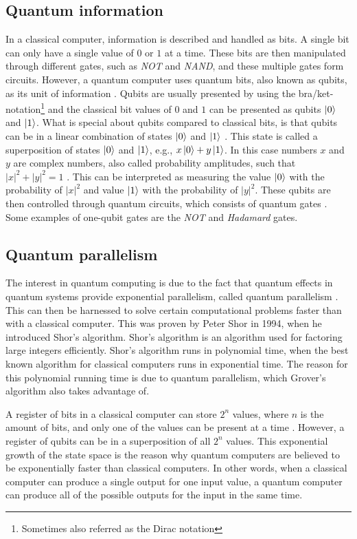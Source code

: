 \documentclass[english,oneside,openright]{UH_DS_report}
\begin{document}
\subsection{Quantum information}
In a classical computer, information is described and handled as bits. A single bit can only have a single value of $0$ or $1$ at a time. These bits are then manipulated through different gates, such as \emph{NOT} and \emph{NAND}, and these multiple gates form circuits. However, a quantum computer uses quantum bits, also known as qubits, as its unit of information \cite{introtoqc}. Qubits are usually presented by using the bra/ket-notation\footnote{Sometimes also referred as the Dirac notation} and the classical bit values of $0$ and $1$ can be presented as qubits $\ket{0}$ and $\ket{1}$. What is special about qubits compared to classical bits, is that qubits can be in a linear combination of states $\ket{0}$ and $\ket{1}$ \cite{lavor2003grover}. This state is called a superposition of states $\ket{0}$ and $\ket{1}$, e.g., $x \ket{0} + y \ket{1}$. In this case numbers $x$ and $y$ are complex numbers, also called probability amplitudes, such that $|x|^{2} + |y|^{2} = 1$ \cite{qcdb}. This can be interpreted as measuring the value $\ket{0}$ with the probability of $|x|^{2}$ and value $\ket{1}$ with the probability of $|y|^{2}$. These qubits are then controlled through quantum circuits, which consists of quantum gates \cite{lavor2003grover}. Some examples of one-qubit gates are the \emph{NOT} and \emph{Hadamard} gates.

\subsection{Quantum parallelism}
The interest in quantum computing is due to the fact that quantum effects in quantum systems provide exponential parallelism, called quantum parallelism \cite{introtoqc}. This can then be harnessed to solve certain computational problems faster than with a classical computer. This was proven by Peter Shor in 1994, when he introduced Shor's algorithm. Shor's algorithm is an algorithm used for factoring large integers efficiently. Shor's algorithm runs in polynomial time, when the best known algorithm for classical computers runs in exponential time. The reason for this polynomial running time is due to quantum parallelism, which Grover's algorithm also takes advantage of.

 A register of bits in a classical computer can store $2^{n}$ values, where $n$ is the amount of bits, and only one of the values can be present at a time \cite{introtoqc}. However, a register of qubits can be in a superposition of all $2^{n}$ values. This exponential growth of the state space is the reason why quantum computers are believed to be exponentially faster than classical computers. In other words, when a classical computer can produce a single output for one input value, a quantum computer can produce all of the possible outputs for the input in the same time.
\end{document}
